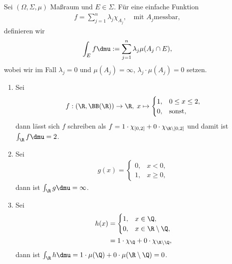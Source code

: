 \begin{defn}
\label{defn:3.26}
Sei $(\Omega,\Sigma,\mu)$ Maßraum und $E\in\Sigma$. Für eine einfache Funktion 
\begin{align*}
f = \sum\limits_{j=1}^n \lambda_j \chi_{A_j},\quad \text{mit } A_j \text{
messbar},
\end{align*}
definieren wir
\begin{align*}
\int_E f\dmu := \sum\limits_{j=1}^n \lambda_j\mu(A_j\cap E),
\end{align*}
wobei wir im Fall $\lambda_j = 0$ und $\mu(A_j) =\infty$, $\lambda_j\cdot
\mu(A_j) = 0$ setzen.\fishhere
\end{defn}

\begin{bspn}
\begin{enumerate}[label=\arabic{*}.)]
  \item Sei
  \begin{align*}
  f: (\R,\BB(\R)) \to \R,\; x\mapsto \begin{cases}
                    1, & 0\le x\le 2,\\
                    0, & \text{sonst},
                    \end{cases}
  \end{align*}
  dann lässt sich $f$ schreiben als $f =
                    1\cdot\chi_{[0,2]} + 0\cdot\chi_{\R\setminus[0,2]}$ und
                    damit ist $\int_\R f \dmu = 2$.
\item Sei
\begin{align*}
g(x) = \begin{cases}
       0, & x <0,\\
       1, & x \ge 0,
       \end{cases}
\end{align*}
dann ist $\int_\R g \dmu = \infty$.
\item Sei
\begin{align*}
h(x) &= \begin{cases}
       1, & x\in \Q,\\
       0, & x\in\R\setminus\Q,
       \end{cases}\\
&= 1 \cdot \chi_\Q + 0 \cdot \chi_{\R\setminus\Q},
\end{align*}
dann ist $\int_\R h \dmu = 1\cdot\mu(\Q) + 0\cdot\mu (\R\setminus \Q) =
0$.\bsphere
\end{enumerate}
\end{bspn}


